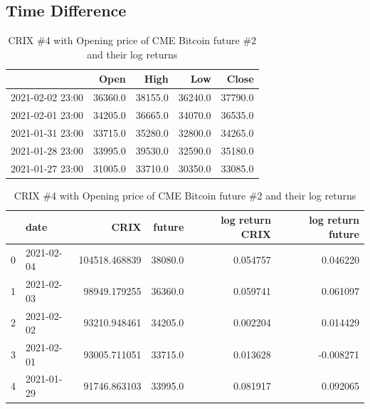 \subsection{Time Difference}\label{subsec:time-difference}
\begin{table}[h]
    \centering

\begin{tabular}{lrrrr}
\toprule
{} &     Open &     High &      Low &    Close \\
\midrule
2021-02-02 23:00 &  36360.0 &  38155.0 &  36240.0 &  37790.0 \\
2021-02-01 23:00 &  34205.0 &  36665.0 &  34070.0 &  36535.0 \\
2021-01-31 23:00 &  33715.0 &  35280.0 &  32800.0 &  34265.0 \\
2021-01-28 23:00 &  33995.0 &  39530.0 &  32590.0 &  35180.0 \\
2021-01-27 23:00 &  31005.0 &  33710.0 &  30350.0 &  33085.0 \\
\bottomrule
\end{tabular}
       \caption{CME Bitcoin Future Raw Data}
    \label{tab:table0} \medskip

    \begin{tabular}[width=\textwidth]{llrrrr}
\toprule
 &                      date &           CRIX &   future &  log return CRIX &  log return future \\
\midrule
0 & 2021-02-04  &  104518.468839 &  38080.0 &         0.054757 &           0.046220 \\
1 & 2021-02-03  &   98949.179255 &  36360.0 &         0.059741 &           0.061097 \\
2 & 2021-02-02  &   93210.948461 &  34205.0 &         0.002204 &           0.014429 \\
3 & 2021-02-01  &   93005.711051 &  33715.0 &         0.013628 &          -0.008271 \\
4 & 2021-01-29  &   91746.863103 &  33995.0 &         0.081917 &           0.092065 \\
\bottomrule
    \end{tabular}
    \caption{CRIX \#4 with Opening price of CME Bitcoin future \#2 and their log returns}
    \label{tab:table2} \medskip


\end{table}
